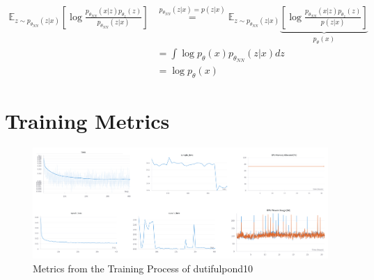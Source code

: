 \begin{align}
    \mathbb{E}_{z\sim p_{\theta_{NN}}(z|x)}\left[\log \frac{p_{\theta_{NN}}(x|z)p_{\theta_z}(z)}{p_{\theta_{NN}}(z|x)}\right] & \stackrel{p_{\theta_{NN}}(z|x) = p(z|x)}{=} \mathbb{E}_{z\sim p_{\theta_{NN}}(z|x)}\underbrace{\left[\log \frac{p_{\theta_{NN}}(x|z)p_{\theta_z}(z)}{p(z|x)}\right]}_{p_{\theta}(x)} \\
                                                                                                                              & = \int \log p_{\theta}(x) p_{\theta_{NN}}(z|x) dz                                                                                                                                    \\
                                                                                                                              & = \log p_{\theta}(x)
\end{align}

\chapter{Training Metrics}
\begin{figure}
    \centering
    \includegraphics[width=\textwidth]{images/dutifulpondmetrics.png}
    \caption[Metrics from the Training Process of dutifulpond10]{Metrics from the Training Process of dutifulpond10}
    \label{fig:dutifulpond10}
\end{figure}

